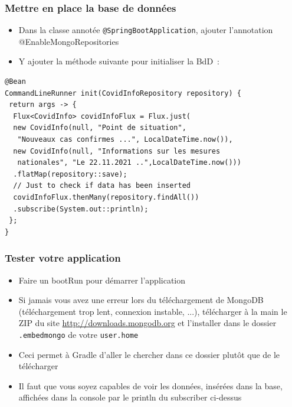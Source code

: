 \documentclass{beamer}
\begin{document}
\begin{frame}[fragile]
	\frametitle{Mettre en place la base de données}
	\begin{itemize}
		\item Dans la classe annotée \texttt{@SpringBootApplication}, ajouter l'annotation 
		@EnableMongoRepositories
		\item Y ajouter la méthode suivante pour initialiser la BdD~:
	\end{itemize}
\begin{lstlisting}
@Bean
CommandLineRunner init(CovidInfoRepository repository) {
 return args -> {
  Flux<CovidInfo> covidInfoFlux = Flux.just(
  new CovidInfo(null, "Point de situation",
   "Nouveaux cas confirmes ...", LocalDateTime.now()),
  new CovidInfo(null, "Informations sur les mesures 
   nationales", "Le 22.11.2021 ..",LocalDateTime.now()))
  .flatMap(repository::save);
  // Just to check if data has been inserted
  covidInfoFlux.thenMany(repository.findAll())
  .subscribe(System.out::println);
 };
}
\end{lstlisting}
	
\end{frame}

\begin{frame}[fragile]
	\frametitle{Tester votre application}
	\begin{itemize}
		\item Faire un bootRun pour démarrer l'application
		\item Si jamais vous avez une erreur lors du téléchargement de MongoDB (téléchargement trop lent, connexion instable, ...), télécharger à la main le ZIP du site \url{http://downloads.mongodb.org} et l'installer dans le dossier \texttt{.embedmongo} de votre \texttt{user.home}
		\item Ceci permet à Gradle d'aller le chercher dans ce dossier plutôt que de le télécharger
		\item Il faut que vous soyez capables de voir les données, insérées dans la base, affichées dans la console par le println du subscriber ci-dessus
	\end{itemize}
\end{frame}
\end{document}
